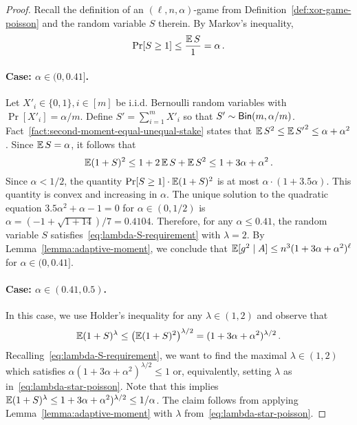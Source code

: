   \begin{proof}
    Recall the definition of an $(\ell, n, \alpha)$-game from Definition~\ref{def:xor-game-poisson}
    and 
    the random variable $S$ therein. 
    By Markov's inequality,
    $$
        \Pr[S \geq 1] \leq \frac{\operatorname{\mathbb{E}} S}{1} = \alpha \,.
    $$

    \paragraph{Case: $\alpha \in (0, 0.41]$.}
    Let $X'_i \in \{0,1\}, i \in [m]$ be i.i.d. Bernoulli random variables 
    with $\Pr[X'_i] = \alpha/m$. 
    Define $S' = \sum_{i=1}^m X'_i$ 
    so that $S'\sim \mathsf{Bin}(m, \alpha/m)$. 
    Fact~\ref{fact:second-moment-equal-unequal-stake} states that 
    $\operatorname{\mathbb{E}} S^2 \leq \operatorname{\mathbb{E}} {S'}^2 \leq \alpha + \alpha^2$. 
    Since $\operatorname{\mathbb{E}} S = \alpha$, it follows that 
    $$
    \operatorname{\mathbb{E}} (1 + S)^2 
    \leq 1 + 2 \operatorname{\mathbb{E}} S + \operatorname{\mathbb{E}} S^2
    \leq 1 + 3 \alpha + \alpha^2
    \,.
    $$
    Since $\alpha < 1/2$, the quantity 
    $\Pr[S \geq 1] \cdot \operatorname{\mathbb{E}} (1 + S)^2$ is at most $\alpha\cdot (1 + 3.5 \alpha)$. 
    This quantity is convex and increasing in $\alpha$. 
    The unique solution to the quadratic equation $3.5 \alpha^2 + \alpha - 1 = 0$ 
    for $\alpha \in (0, 1/2)$ 
    is $\alpha = (-1 + \sqrt{1 + 14})/7 = 0.4104$. 
    Therefore, for any $\alpha \leq 0.41$, 
    the random variable $S$ satisfies~\eqref{eq:lambda-S-requirement} 
    with $\lambda = 2$.
    By Lemma~\ref{lemma:adaptive-moment}, we conclude that 
    $\operatorname{\mathbb{E}}[g^2 \mid A] \leq n^3 (1 + 3 \alpha + \alpha^2)^\ell$ 
    for $\alpha \in (0, 0.41]$.
    
    \paragraph{Case: $\alpha \in (0.41, 0.5)$.}
    In this case, we use Holder's inequality for any $\lambda \in (1,2)$ 
    and observe that 
    $$
        \operatorname{\mathbb{E}} (1+S)^\lambda 
        \leq \left( \operatorname{\mathbb{E}} (1+S)^2 \right)^{\lambda/2} 
        = (1 + 3\alpha +\alpha^2)^{\lambda/2}
        \,.
    $$
    Recalling~\eqref{eq:lambda-S-requirement}, 
    we want to find the maximal $\lambda \in (1, 2)$ 
    which satisfies $\alpha(1 + 3\alpha +\alpha^2)^{\lambda/2} \leq 1$ or, 
    equivalently, setting $\lambda$ as in~\eqref{eq:lambda-star-poisson}. 
    Note that this implies $\operatorname{\mathbb{E}} (1+S)^\lambda \leq 1 + 3\alpha +\alpha^2)^{\lambda/2} \leq 1/\alpha$.
    The claim follows from applying Lemma~\ref{lemma:adaptive-moment} 
    with $\lambda$ from~\eqref{eq:lambda-star-poisson}. 
  \end{proof}


